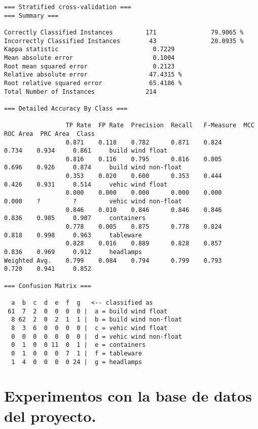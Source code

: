 \documentclass[a4paper]{article}
\begin{document}
\begin{verbatim}
=== Stratified cross-validation ===
=== Summary ===

Correctly Classified Instances         171               79.9065 %
Incorrectly Classified Instances        43               20.0935 %
Kappa statistic                          0.7229
Mean absolute error                      0.1004
Root mean squared error                  0.2123
Relative absolute error                 47.4315 %
Root relative squared error             65.4186 %
Total Number of Instances              214

=== Detailed Accuracy By Class ===

                 TP Rate  FP Rate  Precision  Recall   F-Measure  MCC      ROC Area  PRC Area  Class
                 0.871    0.118    0.782      0.871    0.824      0.734    0.934     0.861     build wind float
                 0.816    0.116    0.795      0.816    0.805      0.696    0.926     0.874     build wind non-float
                 0.353    0.020    0.600      0.353    0.444      0.426    0.931     0.514     vehic wind float
                 0.000    0.000    0.000      0.000    0.000      0.000    ?         ?         vehic wind non-float
                 0.846    0.010    0.846      0.846    0.846      0.836    0.985     0.907     containers
                 0.778    0.005    0.875      0.778    0.824      0.818    0.998     0.963     tableware
                 0.828    0.016    0.889      0.828    0.857      0.836    0.969     0.912     headlamps
Weighted Avg.    0.799    0.084    0.794      0.799    0.793      0.720    0.941     0.852

=== Confusion Matrix ===

  a  b  c  d  e  f  g   <-- classified as
 61  7  2  0  0  0  0 |  a = build wind float
  8 62  2  0  2  1  1 |  b = build wind non-float
  8  3  6  0  0  0  0 |  c = vehic wind float
  0  0  0  0  0  0  0 |  d = vehic wind non-float
  0  1  0  0 11  0  1 |  e = containers
  0  1  0  0  0  7  1 |  f = tableware
  1  4  0  0  0  0 24 |  g = headlamps

\end{verbatim}









\section{Experimentos con la base de datos del proyecto.}
\end{document}
